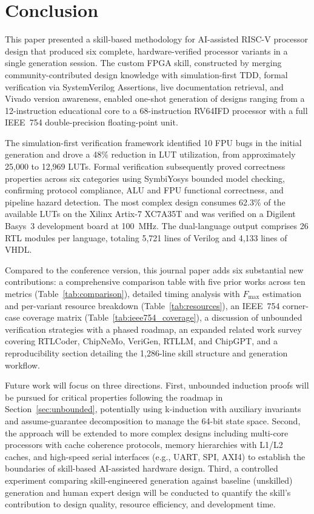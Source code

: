 \documentclass[journal]{IEEEtran}
\begin{document}
\section{Conclusion}
\label{sec:conclusion}

This paper presented a skill-based methodology for AI-assisted RISC-V
processor design that produced six complete, hardware-verified processor
variants in a single generation session.  The custom FPGA skill,
constructed by merging community-contributed design knowledge with
simulation-first TDD, formal verification via SystemVerilog Assertions,
live documentation retrieval, and Vivado version awareness, enabled
one-shot generation of designs ranging from a 12-instruction educational
core to a 68-instruction RV64IFD processor with a full IEEE~754
double-precision floating-point unit.

The simulation-first verification framework identified 10 FPU bugs in
the initial generation and drove a 48\% reduction in LUT utilization,
from approximately 25,000 to 12,969 LUTs.  Formal verification
subsequently proved correctness properties across six categories using
SymbiYosys bounded model checking, confirming protocol compliance, ALU
and FPU functional correctness, and pipeline hazard detection.  The most
complex design consumes 62.3\% of the available LUTs on the Xilinx
Artix-7 XC7A35T and was verified on a Digilent Basys~3 development board
at 100~MHz.  The dual-language output comprises 26 RTL modules per
language, totaling 5,721 lines of Verilog and 4,133 lines of VHDL.

Compared to the conference version, this journal paper adds six
substantial new contributions: a comprehensive comparison table with five
prior works across ten metrics (Table~\ref{tab:comparison}), detailed
timing analysis with $F_{\max}$ estimation and per-variant resource
breakdown (Table~\ref{tab:resources}), an IEEE~754 corner-case coverage
matrix (Table~\ref{tab:ieee754_coverage}), a discussion of unbounded
verification strategies with a phased roadmap, an expanded related work
survey covering RTLCoder, ChipNeMo, VeriGen, RTLLM, and ChipGPT, and a
reproducibility section detailing the 1,286-line skill structure and
generation workflow.

Future work will focus on three directions.  First, unbounded induction
proofs will be pursued for critical properties following the roadmap in
Section~\ref{sec:unbounded}, potentially using k-induction with
auxiliary invariants and assume-guarantee decomposition to manage the
64-bit state space.  Second, the approach will be extended to more
complex designs including multi-core processors with cache coherence
protocols, memory hierarchies with L1/L2 caches, and high-speed serial
interfaces (e.g., UART, SPI, AXI4) to establish the boundaries of
skill-based AI-assisted hardware design.  Third, a controlled
experiment comparing skill-engineered generation against baseline
(unskilled) generation and human expert design will be conducted to
quantify the skill's contribution to design quality, resource
efficiency, and development time.
\end{document}
